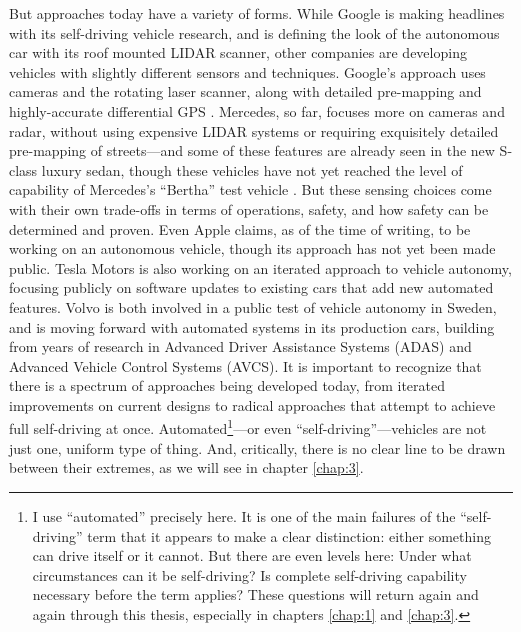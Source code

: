 But approaches today have a variety of forms. While Google is making
headlines with its self-driving vehicle research, and is defining the
look of the autonomous car with its roof mounted LIDAR scanner, other
companies are developing vehicles with slightly different sensors and
techniques. Google's approach uses cameras and the rotating laser
scanner, along with detailed pre-mapping and highly-accurate
differential GPS \cite{guizzo}. Mercedes, so far, focuses more on cameras and radar,
without using expensive LIDAR systems or requiring exquisitely
detailed pre-mapping of streets---and some of these features are
already seen in the new S-class luxury sedan, though these vehicles
have not yet reached the level of capability of Mercedes's ``Bertha''
test vehicle \cite{makingBertha}. But these sensing choices come with their own
trade-offs in terms of operations, safety, and how safety can be
determined and proven. Even Apple claims, as of the time of writing,
to be working on an autonomous vehicle, though its approach has not
yet been made public. Tesla Motors is also working on an iterated
approach to vehicle autonomy, focusing publicly on software updates to
existing cars that add new automated features. Volvo is both involved
in a public test of vehicle autonomy in Sweden, and is moving forward
with automated systems in its production cars, building from years of
research in Advanced Driver Assistance Systems (ADAS) and Advanced
Vehicle Control Systems (AVCS). It is important to recognize that
there is a spectrum of approaches being developed today, from iterated
improvements on current designs to radical approaches that attempt to
achieve full self-driving at once. Automated\footnote{I use ``automated''
  precisely here. It is one of the main failures of the
  ``self-driving'' term that it appears to make a clear distinction: 
  either something can drive itself or it cannot. But there are even
  levels here: Under what circumstances can it be self-driving? Is
  complete self-driving capability necessary before the term applies?
  These questions will return again and again through this thesis,
  especially in chapters \ref{chap:1} and \ref{chap:3}. }---or even
``self-driving''---vehicles are not just one, uniform type of
thing. And, critically, there is no clear
line to be drawn between their extremes, as we will see in chapter
\ref{chap:3}. 




